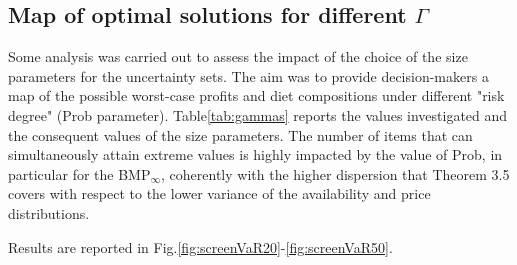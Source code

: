 
\subsection{Map of optimal solutions for different $\Gamma$}

Some analysis was carried out to assess the impact of the choice of the size parameters for the uncertainty sets. The aim was to provide decision-makers a map of the possible worst-case profits and diet compositions under different "risk degree" (Prob parameter). Table\ref{tab:gammas} reports the values investigated and the consequent values of the size parameters. The number of items that can simultaneously attain extreme values is highly impacted by the value of Prob, in particular for the BMP$_\infty$, coherently with the higher dispersion that Theorem 3.5 covers with respect to the lower variance of the availability and price distributions. 

Results are reported in Fig.\ref{fig:screenVaR20}-\ref{fig:screenVaR50}.

